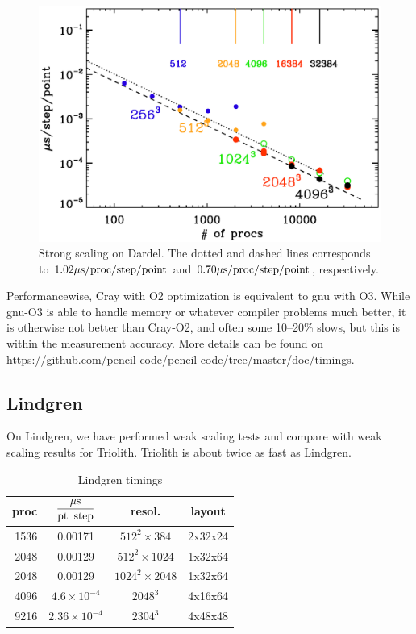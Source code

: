\documentclass[\mydriver,12pt,twoside,notitlepage,a4paper]{article}
\begin{document}
\begin{figure}[h!]\begin{center}
\includegraphics[width=\columnwidth]{pdardel-strong}
\end{center}\caption[]{
Strong scaling on Dardel.
The dotted and dashed lines corresponds to
$1.02\mu{\rm s}/{\rm proc}/{\rm step}/{\rm point}$ and
$0.70\mu{\rm s}/{\rm proc}/{\rm step}/{\rm point}$, respectively.
}\label{pdardel-strong}\end{figure}

Performancewise, Cray with O2 optimization is equivalent to gnu with O3.
While gnu-O3 is able to handle memory or whatever compiler problems much
better, it is otherwise not better than Cray-O2, and often some 10--20\%
slows, but this is within the measurement accuracy.
More details can be found on
\url{https://github.com/pencil-code/pencil-code/tree/master/doc/timings}.

\subsection{Lindgren}

On Lindgren, we have performed weak scaling tests and compare
with weak scaling results for Triolith.
Triolith is about twice as fast as Lindgren.

\begin{table}[htb]
  \begin{center}
    \caption{Lindgren timings}
    \label{Tsummary-Lindgren}
    \begin{tabular}{rccc}
    \toprule
proc & $\displaystyle\frac{{\mu\rm s}}{\rm pt\;\;step}$ & resol. & layout \\
    \midrule
1536&0.00171&$512^2{\times}384$& 2x32x24 \\
2048&0.00129&$512^2{\times}1024$&1x32x64 \\
2048&0.00129&$1024^2{\times}2048$&1x32x64 \\
4096&$4.6{\times}10^{-4}$&$2048^3$&4x16x64 \\
9216&$2.36{\times}10^{-4}$&$2304^3$&4x48x48 \\
    \bottomrule
    \end{tabular}
  \end{center}
\end{table}
\end{document}
